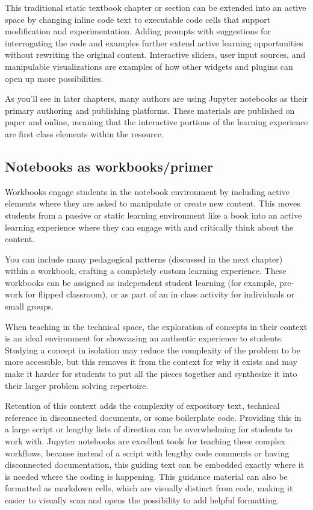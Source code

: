 \documentclass[]{book}
\begin{document}
This traditional static textbook chapter or section can be extended into
an active space by changing inline code text to executable code cells
that support modification and experimentation. Adding prompts with
suggestions for interrogating the code and examples further extend
active learning opportunities without rewriting the original content.
Interactive sliders, user input sources, and manipulable visualizations
are examples of how other widgets and plugins can open up more
possibilities.

As you'll see in later chapters, many authors are using Jupyter
notebooks as their primary authoring and publishing platforms. These
materials are published on paper and online, meaning that the
interactive portions of the learning experience are first class elements
within the resource.

\subsection{Notebooks as
workbooks/primer}\label{notebooks-as-workbooksprimer}

Workbooks engage students in the notebook environment by including
active elements where they are asked to manipulate or create new
content. This moves students from a passive or static learning
environment like a book into an active learning experience where they
can engage with and critically think about the content.

You can include many pedagogical patterns (discussed in the next
chapter) within a workbook, crafting a completely custom learning
experience. These workbooks can be assigned as independent student
learning (for example, pre-work for flipped classroom), or as part of an
in class activity for individuals or small groups.

When teaching in the technical space, the exploration of concepts in
their context is an ideal environment for showcasing an authentic
experience to students. Studying a concept in isolation may reduce the
complexity of the problem to be more accessible, but this removes it
from the context for why it exists and may make it harder for students
to put all the pieces together and synthesize it into their larger
problem solving repertoire.

Retention of this context adds the complexity of expository text,
technical reference in disconnected documents, or some boilerplate code.
Providing this in a large script or lengthy lists of direction can be
overwhelming for students to work with. Jupyter notebooks are excellent
tools for teaching these complex workflows, because instead of a script
with lengthy code comments or having disconnected documentation, this
guiding text can be embedded exactly where it is needed where the coding
is happening. This guidance material can also be formatted as markdown
cells, which are visually distinct from code, making it easier to
visually scan and opens the possibility to add helpful formatting.
\end{document}
